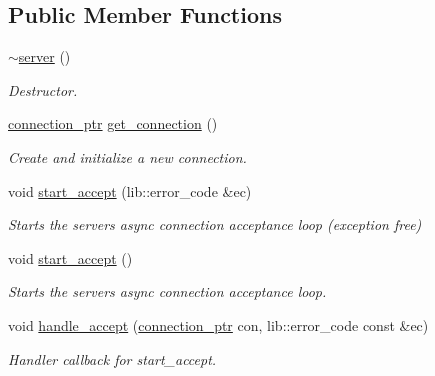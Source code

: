 \subsection*{Public Member Functions}
\begin{DoxyCompactItemize}
\item 
\mbox{\label{classwebsocketpp_1_1server_aa9f0c40951f9a365e23233551fbc3f6b}} 
\mbox{\hyperlink{classwebsocketpp_1_1server_aa9f0c40951f9a365e23233551fbc3f6b}{$\sim$server}} ()
\begin{DoxyCompactList}\small\item\em Destructor. \end{DoxyCompactList}\item 
\mbox{\hyperlink{classwebsocketpp_1_1server_a0b93f09ceae3d1dafd2f7b1da759c2ad}{connection\+\_\+ptr}} \mbox{\hyperlink{classwebsocketpp_1_1server_a9146c63ed1afb5bdec29eca52c487226}{get\+\_\+connection}} ()
\begin{DoxyCompactList}\small\item\em Create and initialize a new connection. \end{DoxyCompactList}\item 
void \mbox{\hyperlink{classwebsocketpp_1_1server_a0204a7d444144f7ea5b8bbcf14689fc1}{start\+\_\+accept}} (lib\+::error\+\_\+code \&ec)
\begin{DoxyCompactList}\small\item\em Starts the server\textquotesingle{}s async connection acceptance loop (exception free) \end{DoxyCompactList}\item 
void \mbox{\hyperlink{classwebsocketpp_1_1server_ab61bcdf9fd532fe7ebd934f8d84fdfea}{start\+\_\+accept}} ()
\begin{DoxyCompactList}\small\item\em Starts the server\textquotesingle{}s async connection acceptance loop. \end{DoxyCompactList}\item 
\mbox{\label{classwebsocketpp_1_1server_aa24feb1c5d2bde47de8b11f5369c54d4}} 
void \mbox{\hyperlink{classwebsocketpp_1_1server_aa24feb1c5d2bde47de8b11f5369c54d4}{handle\+\_\+accept}} (\mbox{\hyperlink{classwebsocketpp_1_1server_a0b93f09ceae3d1dafd2f7b1da759c2ad}{connection\+\_\+ptr}} con, lib\+::error\+\_\+code const \&ec)
\begin{DoxyCompactList}\small\item\em Handler callback for start\+\_\+accept. \end{DoxyCompactList}\end{DoxyCompactItemize}
